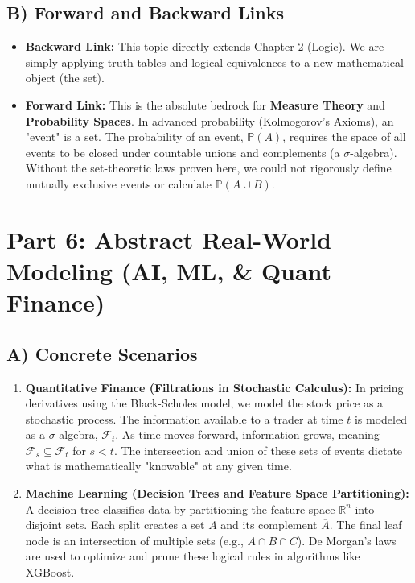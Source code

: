 \documentclass[11pt, a4paper]{article}
\theoremstyle{definition}
\theoremstyle{remark}
\begin{document}
\subsection{B) Forward and Backward Links}
\begin{itemize}
    \item \textbf{Backward Link:} This topic directly extends Chapter 2 (Logic). We are simply applying truth tables and logical equivalences to a new mathematical object (the set).
    \item \textbf{Forward Link:} This is the absolute bedrock for \textbf{Measure Theory} and \textbf{Probability Spaces}. In advanced probability (Kolmogorov's Axioms), an "event" is a set. The probability of an event, $\mathbb{P}(A)$, requires the space of all events to be closed under countable unions and complements (a $\sigma$-algebra). Without the set-theoretic laws proven here, we could not rigorously define mutually exclusive events or calculate $\mathbb{P}(A \cup B)$.
\end{itemize}

\section{Part 6: Abstract Real-World Modeling (AI, ML, \& Quant Finance)}

\subsection{A) Concrete Scenarios}
\begin{enumerate}
    \item \textbf{Quantitative Finance (Filtrations in Stochastic Calculus):} In pricing derivatives using the Black-Scholes model, we model the stock price as a stochastic process. The information available to a trader at time $t$ is modeled as a $\sigma$-algebra, $\mathcal{F}_t$. As time moves forward, information grows, meaning $\mathcal{F}_s \subseteq \mathcal{F}_t$ for $s < t$. The intersection and union of these sets of events dictate what is mathematically "knowable" at any given time.
    \item \textbf{Machine Learning (Decision Trees and Feature Space Partitioning):} A decision tree classifies data by partitioning the feature space $\mathbb{R}^n$ into disjoint sets. Each split creates a set $A$ and its complement $\overline{A}$. The final leaf node is an intersection of multiple sets (e.g., $A \cap B \cap \overline{C}$). De Morgan's laws are used to optimize and prune these logical rules in algorithms like XGBoost.
\end{enumerate}
\end{document}
